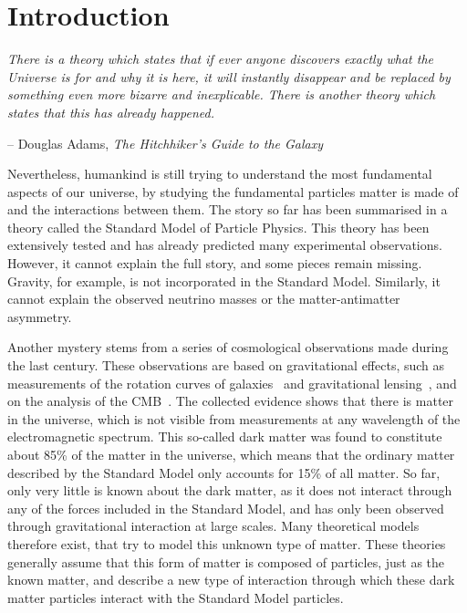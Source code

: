 \graphicspath{{chapt_dutch/}{intro/}{theory/}{detector/}{reconstruction/}}

\renewcommand\evenpagerightmark{{\scshape\small Chapter 1}}
\renewcommand\oddpageleftmark{{\scshape\small Introduction}}

\hyphenation{}

\chapter{Introduction}
\label{ch:intro}


\begin{flushleft} 
\textit{There is a theory which states that if ever anyone discovers exactly what the Universe is for and why it is here, it will instantly disappear and be replaced by something even more bizarre and inexplicable. There is another theory which states that this has already happened.}
\end{flushleft}
\begin{flushright}
-- Douglas Adams, \textit{The Hitchhiker's Guide to the Galaxy}
\end{flushright}

Nevertheless, humankind is still trying to understand the most fundamental aspects of our universe, by studying the fundamental particles matter is made of and the interactions between them. The story so far has been summarised in a theory called the Standard Model of Particle Physics. This theory has been extensively tested and has already predicted many experimental observations. However, it cannot explain the full story, and some pieces remain missing. Gravity, for example, is not incorporated in the Standard Model. Similarly, it cannot explain the observed neutrino masses or the matter-antimatter asymmetry.

Another mystery stems from a series of cosmological observations made during the last century. These observations are based on gravitational effects, such as measurements of the rotation curves of galaxies~\cite{Begeman:1991iy} and gravitational lensing~\cite{Belokurov:2008pu}, and on the analysis of the \acf{CMB}~\cite{Smoot:1992td,Komatsu:2010fb,Ade:2013zuv}. The collected evidence shows that there is matter in the universe, which is not visible from measurements at any wavelength of the electromagnetic spectrum. This so-called dark matter was found to constitute about 85\% of the matter in the universe, which means that the ordinary matter described by the Standard Model only accounts for 15\% of all matter. So far, only very little is known about the dark matter, as it does not interact through any of the forces included in the Standard Model, and has only been observed through gravitational interaction at large scales. Many theoretical models therefore exist, that try to model this unknown type of matter. These theories generally assume that this form of matter is composed of particles, just as the known matter, and describe a new type of interaction through which these dark matter particles interact with the Standard Model particles.

